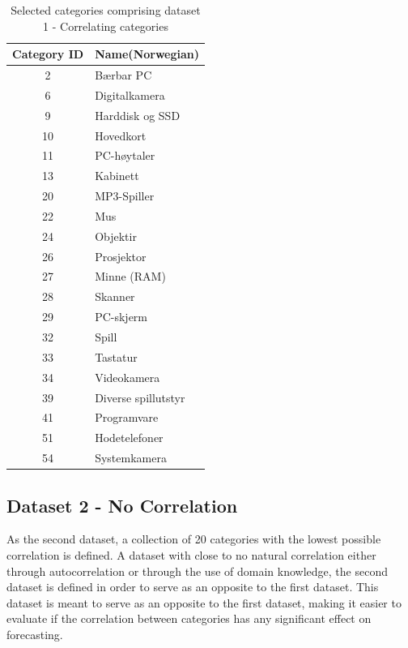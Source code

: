 \begin{table}[H]
  \centering
  \caption{Selected categories comprising dataset 1 - Correlating categories}
  \label{table:dataset1}
  \begin{tabular}{|c|l|}\hline
    Category ID & Name(Norwegian) \\ \hline
    2           & Bærbar PC    \\ \hline
    6           & Digitalkamera     \\ \hline
    9           & Harddisk og SSD      \\ \hline
    10          & Hovedkort     \\ \hline
    11          & PC-høytaler     \\ \hline
    13          & Kabinett     \\ \hline
    20          & MP3-Spiller      \\ \hline
    22          & Mus      \\ \hline
    24          & Objektir     \\ \hline
    26          & Prosjektor      \\ \hline
    27          & Minne (RAM)      \\ \hline
    28          & Skanner   \\ \hline
    29          & PC-skjerm    \\ \hline
    32          & Spill      \\ \hline
    33          & Tastatur     \\ \hline
    34          & Videokamera     \\ \hline
    39          & Diverse spillutstyr     \\ \hline
    41          & Programvare     \\ \hline
    51          & Hodetelefoner    \\ \hline
    54          & Systemkamera     \\ \hline
  \end{tabular}
\end{table}



\subsection{Dataset 2 - No Correlation}

As the second dataset, a collection of 20 categories with the lowest possible correlation is defined.
A dataset with close to no natural correlation either through autocorrelation or through the use of domain knowledge, the second dataset is defined in order to serve as an opposite to the first dataset.
This dataset is meant to serve as an opposite to the first dataset, making it easier to evaluate if the correlation between categories has any significant effect on forecasting.

